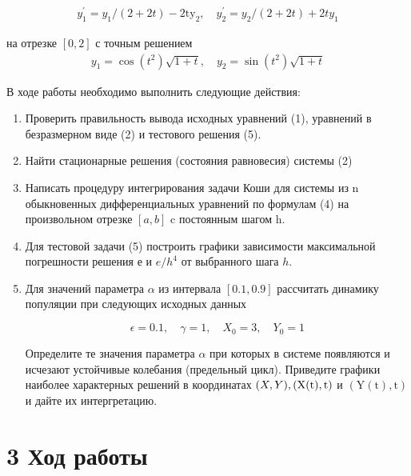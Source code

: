 \documentclass[a4paper,14pt]{extreport}
\begin{document}
\begin{equation}
    \begin{aligned}
y_1^{\prime}=y_1 /(2+2 t)-2 \mathrm{ty}_2, \quad y_2^{\prime}=y_2 /(2+2 t)+2 t y_1
    \end{aligned}
\end{equation}

на отрезке $[0,2]$ с точным решением\\
 \begin{equation*}
    \begin{aligned}
y_1=\cos \left(t^2\right) \sqrt{1+t}, \quad y_2=\sin \left(t^2\right) \sqrt{1+t}
    \end{aligned}
\end{equation*}

В ходе работы необходимо выполнить следующие действия:
	
	\begin{enumerate}
	 \item Проверить правильность вывода исходных уравнений (1), уравнений в безразмерном виде (2) и тестового решения (5).
	 \item Найти стационарные решения (состояния равновесия) системы (2)
	\item Написать процедуру интегрирования задачи Коши для системы из $\mathrm{n}$ обыкновенных дифференциальных уравнений по формулам (4) на произвольном отрезке $[a, b]$ c постоянным шагом $\mathrm{h}$.
  	\item Для тестовой задачи (5) построить графики зависимости максимальной погрешности решения е и $e / h^4$ от выбранного шага $h$.
  	\item Для значений параметра $\alpha$ из интервала $[0.1,0.9]$ рассчитать динамику популяции при следующих исходных данных

$$
\epsilon=0.1, \quad \gamma=1, \quad X_0=3, \quad Y_0=1
$$

Определите те значения параметра $\alpha$ при которых в системе появляются и исчезают устойчивые колебания (предельный цикл). Приведите графики наиболее характерных решений в координатах $(X, Y), \newline(\mathrm{X}(\mathrm{t}),  \mathrm{t})$ и $(\mathrm{Y}(\mathrm{t}), \mathrm{t})$ и дайте их интергретацию.
	\end{enumerate}


	\newpage
	
	\section*{3 Ход работы}
\end{document}
